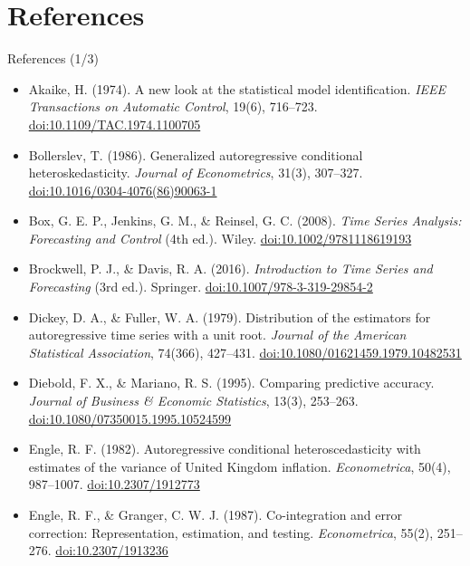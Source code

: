 \section{References}

\begin{frame}{References (1/3)}
\itemsize{\scriptsize}
\begin{itemize}
    \item Akaike, H. (1974). A new look at the statistical model identification. \textit{IEEE Transactions on Automatic Control}, 19(6), 716--723. \href{https://doi.org/10.1109/TAC.1974.1100705}{doi:10.1109/TAC.1974.1100705}
    \item Bollerslev, T. (1986). Generalized autoregressive conditional heteroskedasticity. \textit{Journal of Econometrics}, 31(3), 307--327. \href{https://doi.org/10.1016/0304-4076(86)90063-1}{doi:10.1016/0304-4076(86)90063-1}
    \item Box, G. E. P., Jenkins, G. M., \& Reinsel, G. C. (2008). \textit{Time Series Analysis: Forecasting and Control} (4th ed.). Wiley. \href{https://doi.org/10.1002/9781118619193}{doi:10.1002/9781118619193}
    \item Brockwell, P. J., \& Davis, R. A. (2016). \textit{Introduction to Time Series and Forecasting} (3rd ed.). Springer. \href{https://doi.org/10.1007/978-3-319-29854-2}{doi:10.1007/978-3-319-29854-2}
    \item Dickey, D. A., \& Fuller, W. A. (1979). Distribution of the estimators for autoregressive time series with a unit root. \textit{Journal of the American Statistical Association}, 74(366), 427--431. \href{https://doi.org/10.1080/01621459.1979.10482531}{doi:10.1080/01621459.1979.10482531}
    \item Diebold, F. X., \& Mariano, R. S. (1995). Comparing predictive accuracy. \textit{Journal of Business \& Economic Statistics}, 13(3), 253--263. \href{https://doi.org/10.1080/07350015.1995.10524599}{doi:10.1080/07350015.1995.10524599}
    \item Engle, R. F. (1982). Autoregressive conditional heteroscedasticity with estimates of the variance of United Kingdom inflation. \textit{Econometrica}, 50(4), 987--1007. \href{https://doi.org/10.2307/1912773}{doi:10.2307/1912773}
    \item Engle, R. F., \& Granger, C. W. J. (1987). Co-integration and error correction: Representation, estimation, and testing. \textit{Econometrica}, 55(2), 251--276. \href{https://doi.org/10.2307/1913236}{doi:10.2307/1913236}
\end{itemize}
\end{frame}

